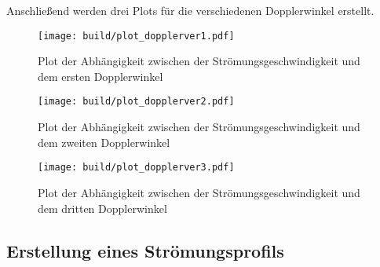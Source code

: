 Anschließend werden drei Plots für die verschiedenen Dopplerwinkel erstellt.
\begin{figure}
    \centering
    \texttt{[image: build/plot\_dopplerver1.pdf]}
    \caption{Plot der Abhängigkeit zwischen der Strömungsgeschwindigkeit und dem ersten Dopplerwinkel}
    \label{fig:doppler1}
\end{figure}
\begin{figure}
    \centering
    \texttt{[image: build/plot\_dopplerver2.pdf]}
    \caption{Plot der Abhängigkeit zwischen der Strömungsgeschwindigkeit und dem zweiten Dopplerwinkel}
    \label{fig:doppler2}
\end{figure}
\begin{figure}
    \centering
    \texttt{[image: build/plot\_dopplerver3.pdf]}
    \caption{Plot der Abhängigkeit zwischen der Strömungsgeschwindigkeit und dem dritten Dopplerwinkel}
    \label{fig:doppler3}
\end{figure}

\subsection{Erstellung eines Strömungsprofils}
\label{ssec:aus2}

